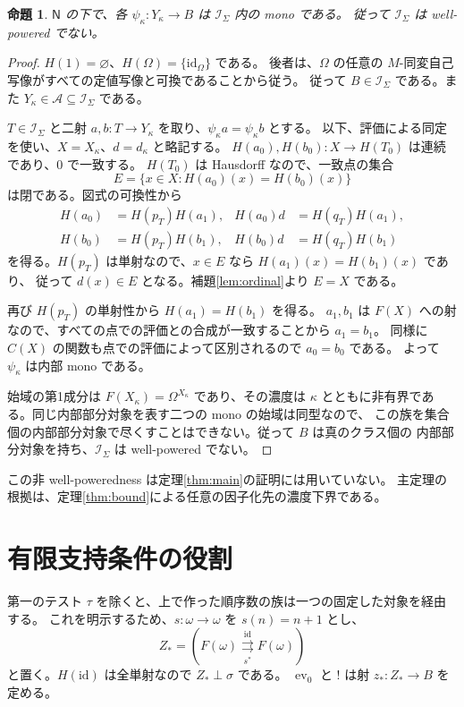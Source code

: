 \documentclass[a4paper,11pt]{ltjsarticle}
\theoremstyle{japaneseplain}
\newtheorem{proposition}[theorem]{命題}
\newcommand{\A}{\mathcal A}
\newcommand{\Ical}{\mathcal I}
\newcommand{\Naxiom}{\mathsf N}
\newcommand{\id}{\mathrm{id}}
\newcommand{\ev}{\operatorname{ev}}
\newcommand{\pairarrows}[2]{\mathrel{\mathop{\rightrightarrows}\limits^{#1}_{#2}}}
\begin{document}
\begin{proposition}\label{prop:internalmono}
$\Naxiom$ の下で、各 $\psi_\kappa:Y_\kappa\to B$ は $\Ical_\Sigma$ 内の mono である。
従って $\Ical_\Sigma$ は well-powered でない。
\end{proposition}
\begin{proof}
$H(1)=\varnothing$、$H(\Omega)=\{\id_\Omega\}$ である。
後者は、$\Omega$ の任意の $M$-同変自己写像がすべての定値写像と可換であることから従う。
従って $B\in\Ical_\Sigma$ である。また $Y_\kappa\in\A\subseteq\Ical_\Sigma$ である。

$T\in\Ical_\Sigma$ と二射 $a,b:T\to Y_\kappa$ を取り、$\psi_\kappa a=\psi_\kappa b$ とする。
以下、評価による同定を使い、$X=X_\kappa$、$d=d_\kappa$ と略記する。
$H(a_0),H(b_0):X\to H(T_0)$ は連続であり、$0$ で一致する。
$H(T_0)$ は Hausdorff なので、一致点の集合
\[
 E=\{x\in X:H(a_0)(x)=H(b_0)(x)\}
\]
は閉である。図式の可換性から
\[
 \begin{aligned}
 H(a_0)&=H(p_T)H(a_1),& H(a_0)d&=H(q_T)H(a_1),\\
 H(b_0)&=H(p_T)H(b_1),& H(b_0)d&=H(q_T)H(b_1)
 \end{aligned}
\]
を得る。$H(p_T)$ は単射なので、$x\in E$ なら $H(a_1)(x)=H(b_1)(x)$ であり、
従って $d(x)\in E$ となる。補題\ref{lem:ordinal}より $E=X$ である。

再び $H(p_T)$ の単射性から $H(a_1)=H(b_1)$ を得る。
$a_1,b_1$ は $F(X)$ への射なので、すべての点での評価との合成が一致することから $a_1=b_1$。
同様に $C(X)$ の関数も点での評価によって区別されるので $a_0=b_0$ である。
よって $\psi_\kappa$ は内部 mono である。

始域の第1成分は $F(X_\kappa)=\Omega^{X_\kappa}$ であり、その濃度は
$\kappa$ とともに非有界である。同じ内部部分対象を表す二つの mono の始域は同型なので、
この族を集合個の内部部分対象で尽くすことはできない。従って $B$ は真のクラス個の
内部部分対象を持ち、$\Ical_\Sigma$ は well-powered でない。
\end{proof}

この非 well-poweredness は定理\ref{thm:main}の証明には用いていない。
主定理の根拠は、定理\ref{thm:bound}による任意の因子化先の濃度下界である。

\section{有限支持条件の役割}\label{app:boundary}

第一のテスト $\tau$ を除くと、上で作った順序数の族は一つの固定した対象を経由する。
これを明示するため、$s:\omega\to\omega$ を $s(n)=n+1$ とし、
\[
 Z_*=(F(\omega)\pairarrows{\id}{s^*}F(\omega))
\]
と置く。$H(\id)$ は全単射なので $Z_*\perp\sigma$ である。
$\ev_0$ と $!$ は射 $z_*:Z_*\to B$ を定める。
\end{document}
